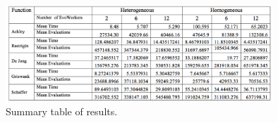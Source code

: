 \documentclass{llncs}
\begin{document}
\begin{figure}[t]
    \centering
        \includegraphics[width=10cm]{img/table.png}
    \caption{Summary table of results. }
    \label{fig:summary}
\end{figure}



\end{document}
